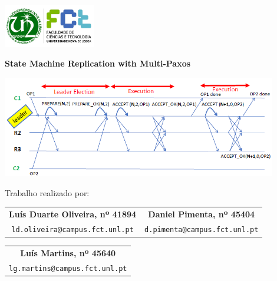 \documentclass[12pt]{article}
\begin{document}
\begin{titlepage}
    \includegraphics[width=0.3\textwidth]{fctUnlLogo.jpg}
    \begin{center}
        \vspace{0.5cm}

        \begin{Large}
        	{\textbf{State Machine Replication with Multi-Paxos}}\\
        \end{Large}
               
        \vspace{0.3cm}

		\includegraphics[width=0.9\textwidth]{multipaxos.png}
		
        \vspace{0.3cm}
        
        Trabalho realizado por:
        
        \vspace{0.5cm}

		\begin{table}[htbp]
		\centering
        	\begin{tabular}{c c}
				\textbf{Luís Duarte Oliveira, nº 41894} & \textbf{Daniel Pimenta, nº 45404}\\
				\texttt{ld.oliveira@campus.fct.unl.pt} & \texttt{d.pimenta@campus.fct.unl.pt}\\
			\end{tabular}
		\end{table}
		
		\begin{table}[htbp]
		\centering
        	\begin{tabular}{c}
				\textbf{Luís Martins, nº 45640}\\
				\texttt{lg.martins@campus.fct.unl.pt}\\
			\end{tabular}
		\end{table}
		

\end{center}
\end{titlepage}
\end{document}
